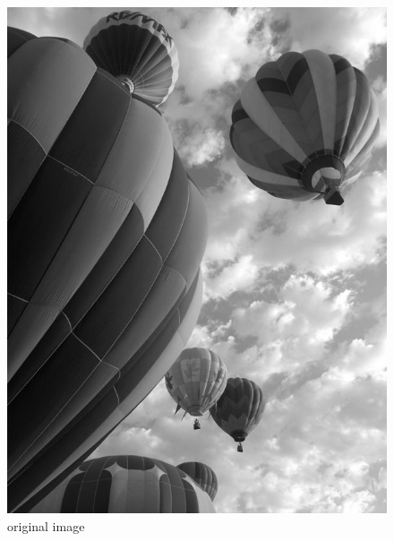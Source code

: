 \begin{figure}[ht]
\begin{minipage}[b]{.45\linewidth}
\centering
\includegraphics[width=\textwidth]{baloons_resized_bw.jpg}
\caption*{original image}
\end{minipage}
\hspace{0.5cm}
\begin{minipage}[b]{0.45\linewidth}
\centering

\end{minipage}
\end{figure}
